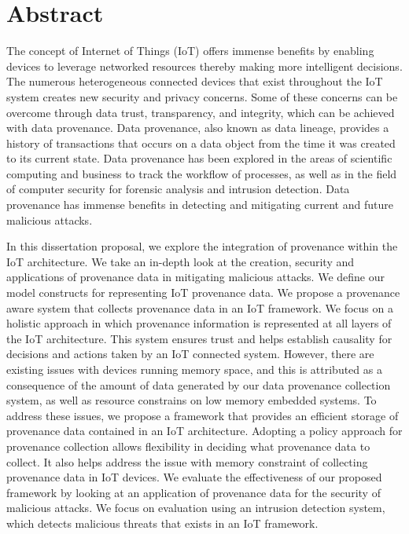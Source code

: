 

\chapter*{Abstract}
The concept of Internet of Things (IoT) offers immense benefits by
enabling devices to leverage networked resources thereby making more intelligent
decisions. The numerous heterogeneous connected devices that exist throughout
the IoT system creates new security and privacy concerns. Some of these concerns can
be overcome through data trust, transparency, and integrity, which can be
achieved with data provenance. Data provenance, also known as data lineage, provides a history of transactions that occurs on a data object from the time it was created to its current state. Data provenance has been explored in the areas of scientific computing and business to track the workflow of processes, as well as in the field of computer security for forensic analysis and intrusion detection. Data provenance has immense benefits in detecting and mitigating current and future malicious attacks.  \par In this dissertation proposal, we explore the integration of provenance within the IoT architecture. We take an in-depth look at the creation, security and applications of provenance data in mitigating malicious attacks. We define our model constructs for representing IoT provenance data. We propose a provenance aware system that collects provenance data in an IoT framework. We focus on a holistic approach in which provenance information is represented at all layers of the IoT architecture. This system ensures trust and helps establish causality for decisions and actions taken by an IoT connected system. However, there are existing issues with devices running memory space, and this is attributed as a consequence of the amount of data generated by our data provenance collection system, as well as resource constrains on low memory embedded systems. To address these issues, we propose a framework that provides an efficient storage of provenance data contained in an IoT architecture. Adopting a policy approach for provenance collection allows flexibility in deciding what provenance data to collect. It also helps address the issue with memory constraint  of collecting provenance data in IoT devices. We evaluate the effectiveness of our proposed framework by looking at an application of provenance data for the security of malicious attacks. We focus on evaluation using an intrusion detection system, which detects malicious threats that exists in an IoT framework.


